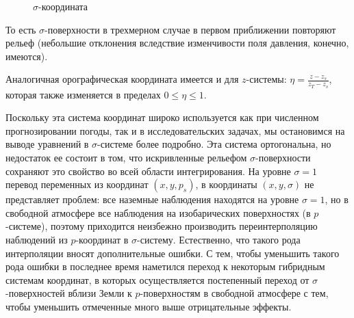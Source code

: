     \begin{figure}[h]
        \centering
        \caption{\label{fig:ch9.1} $\sigma$-координата}
    \end{figure}    

То есть $\sigma$-поверхности в трехмерном случае в первом приближении повторяют рельеф (небольшие отклонения вследствие изменчивости поля давления, конечно, имеются).

Аналогичная орографическая координата имеется и для $z$-системы: $\eta=\frac{z-z_s}{z_T-z_s}$, которая также изменяется в пределах $0\leq\eta\leq1$.

Поскольку эта система координат широко используется как при численном прогнозировании погоды, так и в исследовательских задачах, мы остановимся на выводе уравнений в $\sigma$-системе более подробно. Эта система ортогональна, но недостаток ее состоит в том, что искривленные рельефом $\sigma$-поверхности сохраняют это свойство во всей области интегрирования. На уровне $\sigma=1$ перевод переменных из координат $(x,y,p_s)$, в координаты $(x,y,\sigma)$ не представляет проблем: все наземные наблюдения находятся на уровне $\sigma=1$, но в свободной атмосфере все наблюдения на изобарических поверхностях (в $p$-системе), поэтому приходится неизбежно производить переинтерполяцию наблюдений из $p$-координат в $\sigma$-систему. Естественно, что такого рода интерполяции вносят дополнительные ошибки. С тем, чтобы уменьшить такого рода ошибки в последнее время наметился переход к некоторым гибридным системам координат, в которых осуществляется постепенный переход от $\sigma$-поверхностей вблизи Земли к $p$-поверхностям в свободной атмосфере с тем, чтобы уменьшить отмеченные много выше отрицательные эффекты. 

